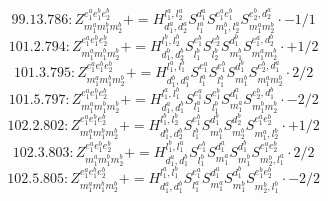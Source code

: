 \documentclass[letterpaper,10pt,fleqn,leqno,onecolumn]{article}
\begin{document}
\begin{equation} \;\;\;\;\;\;  99.13.786: Z^{e_{1}^{a}e_{1}^{b}e_{2}^{b}}_{m_{1}^{a}m_{1}^{b}m_{2}^{b}}+=H^{l_{1}^{a},l_{2}^{a}}_{d_{1}^{a},d_{2}^{a}}S^{d_{1}^{a}}_{l_{1}^{a}}S^{e_{1}^{a}e_{1}^{b}}_{m_{1}^{b},l_{2}^{a}}S^{e_{2}^{b},d_{2}^{a}}_{m_{1}^{a}m_{2}^{b}}\cdot -1/1 \end{equation}
\begin{equation} \;\;\;\;\;\;  101.2.794: Z^{e_{1}^{a}e_{1}^{b}e_{2}^{b}}_{m_{1}^{a}m_{1}^{b}m_{2}^{b}}+=H^{l_{1}^{b},l_{2}^{b}}_{d_{1}^{b},d_{2}^{b}}S^{e_{1}^{b}}_{l_{1}^{b}}S^{e_{2}^{b}}_{l_{2}^{b}}S^{d_{1}^{b}}_{m_{1}^{b}}S^{e_{1}^{a},d_{2}^{b}}_{m_{1}^{a}m_{2}^{b}}\cdot +1/2 \end{equation}
\begin{equation} \;\;\;\;\;\;  101.3.795: Z^{e_{1}^{a}e_{1}^{b}e_{2}^{b}}_{m_{1}^{a}m_{1}^{b}m_{2}^{b}}+=H^{l_{1}^{a},l_{1}^{b}}_{d_{1}^{b},d_{1}^{a}}S^{e_{1}^{a}}_{l_{1}^{a}}S^{e_{1}^{b}}_{l_{1}^{b}}S^{d_{1}^{b}}_{m_{1}^{b}}S^{e_{2}^{b},d_{1}^{a}}_{m_{1}^{a}m_{2}^{b}}\cdot 2/2 \end{equation}
\begin{equation} \;\;\;\;\;\;  101.5.797: Z^{e_{1}^{a}e_{1}^{b}e_{2}^{b}}_{m_{1}^{a}m_{1}^{b}m_{2}^{b}}+=H^{l_{1}^{a},l_{1}^{b}}_{d_{1}^{a},d_{1}^{b}}S^{e_{1}^{a}}_{l_{1}^{a}}S^{e_{1}^{b}}_{l_{1}^{b}}S^{d_{1}^{a}}_{m_{1}^{a}}S^{e_{2}^{b},d_{1}^{b}}_{m_{1}^{b}m_{2}^{b}}\cdot -2/2 \end{equation}
\begin{equation} \;\;\;\;\;\;  102.2.802: Z^{e_{1}^{a}e_{1}^{b}e_{2}^{b}}_{m_{1}^{a}m_{1}^{b}m_{2}^{b}}+=H^{l_{1}^{b},l_{2}^{b}}_{d_{1}^{b},d_{2}^{b}}S^{e_{1}^{b}}_{l_{1}^{b}}S^{d_{1}^{b}}_{m_{1}^{b}}S^{d_{2}^{b}}_{m_{2}^{b}}S^{e_{1}^{a}e_{2}^{b}}_{m_{1}^{a},l_{2}^{b}}\cdot +1/2 \end{equation}
\begin{equation} \;\;\;\;\;\;  102.3.803: Z^{e_{1}^{a}e_{1}^{b}e_{2}^{b}}_{m_{1}^{a}m_{1}^{b}m_{2}^{b}}+=H^{l_{1}^{b},l_{1}^{a}}_{d_{1}^{a},d_{1}^{b}}S^{e_{1}^{b}}_{l_{1}^{b}}S^{d_{1}^{a}}_{m_{1}^{a}}S^{d_{1}^{b}}_{m_{1}^{b}}S^{e_{1}^{a}e_{2}^{b}}_{m_{2}^{b},l_{1}^{a}}\cdot 2/2 \end{equation}
\begin{equation} \;\;\;\;\;\;  102.5.805: Z^{e_{1}^{a}e_{1}^{b}e_{2}^{b}}_{m_{1}^{a}m_{1}^{b}m_{2}^{b}}+=H^{l_{1}^{a},l_{1}^{b}}_{d_{1}^{a},d_{1}^{b}}S^{e_{1}^{a}}_{l_{1}^{a}}S^{d_{1}^{a}}_{m_{1}^{a}}S^{d_{1}^{b}}_{m_{1}^{b}}S^{e_{1}^{b}e_{2}^{b}}_{m_{2}^{b},l_{1}^{b}}\cdot -2/2 \end{equation}
\end{document}
